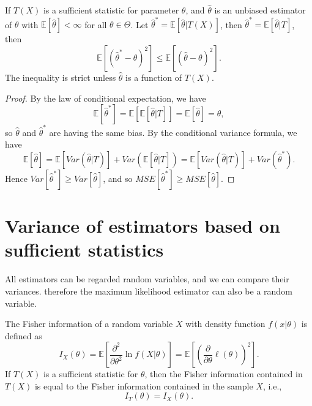 \begin{lemma}
    If $T(X)$ is a sufficient statistic for parameter $\theta$, and $\widehat{\theta}$ is an unbiased estimator of $\theta$ 
    with $\mathbb{E}[\widehat{\theta}] < \infty$ for all $\theta \in \Theta$. Let $\widehat{\theta}^* = \mathbb{E}[\widehat{\theta}|T(X)]$, then $\widehat{\theta}^* = \mathbb{E}[\widehat{\theta} | T]$, then 
    \begin{equation}
        \mathbb{E}[(\widehat{\theta}^* - \theta)^2] \leq \mathbb{E}[(\widehat{\theta} - \theta)^2].
    \end{equation}
    The inequality is strict unless $\widehat{\theta}$ is a function of $T(X)$.
\end{lemma}
\begin{proof}
    By the law of conditional expectation, we have
    \[
        \mathbb{E}[\widehat{\theta}^*] = \mathbb{E}[\mathbb{E}[\widehat{\theta}|T]] = \mathbb{E}[\widehat{\theta}] = \theta,
    \]
    so $\widehat{\theta}$ and $\widehat{\theta}^*$ are having the same bias. By the conditional variance formula, we have
    \[
        \mathbb{E}[\widehat{\theta}] = \mathbb{E}[Var(\widehat{\theta}|T)] + Var(\mathbb{E}[\widehat{\theta}|T]) = \mathbb{E}[Var(\widehat{\theta}|T)] + Var(\widehat{\theta}^*).
    \]
    Hence $Var[\widehat{\theta}^*] \geq Var[\widehat{\theta}]$, and so
    $MSE[\widehat{\theta}^*] \geq MSE[\widehat{\theta}]$.
\end{proof}

\section{Variance of estimators based on sufficient statistics}

All estimators can be regarded random variables, and we can compare their variances.
therefore the maximum likelihood estimator can also be a random variable.

\begin{definition}
    The Fisher information of a random variable $X$ with density function $f(x|\theta)$ is defined as
    \[
        I_X(\theta) = \mathbb{E}\left[\frac{\partial^2}{\partial \theta^2} \ln f(X|\theta) \right] = \mathbb{E}\left[ \left( \frac{\partial}{\partial \theta} \ell(\theta) \right)^2 \right].
    \]
    If $T(X)$ is a sufficient statistic for $\theta$, then the Fisher information contained in $T(X)$ is equal to the Fisher information contained in the sample $X$, i.e.,
    \[
        I_T(\theta) = I_X(\theta).
    \]
\end{definition}

